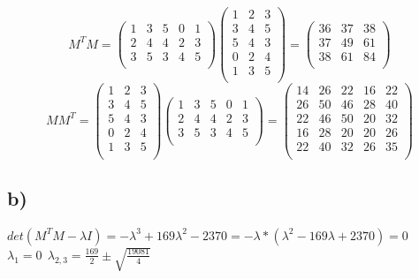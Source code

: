 \documentclass[a4paper,10pt]{article}
\begin{document}
\[M^TM = \left( \begin{array}{ccccc}
1 & 3 & 5 & 0 & 1 \\
2 & 4 & 4 & 2 & 3 \\
3 & 5 & 3 & 4 & 5 \\
\end{array} \right)
%
\left( \begin{array}{ccccc}
1 & 2 & 3 \\
3 & 4 & 5 \\
5 & 4 & 3 \\
0 & 2 & 4 \\
1 & 3 & 5 \\
\end{array} \right)
=\left( \begin{array}{ccc}
36 & 37 & 38 \\
37 & 49 & 61 \\
38 & 61 & 84 \\
\end{array} \right)
\]
\[MM^T = 
\left( \begin{array}{ccccc}
1 & 2 & 3 \\
3 & 4 & 5 \\
5 & 4 & 3 \\
0 & 2 & 4 \\
1 & 3 & 5 \\
\end{array} \right) 
\left( \begin{array}{ccccc}
1 & 3 & 5 & 0 & 1 \\
2 & 4 & 4 & 2 & 3 \\
3 & 5 & 3 & 4 & 5 \\
\end{array} \right)
=
\left( \begin{array}{ccccc}
14 & 26 & 22 & 16 & 22 \\
26 & 50 & 46 & 28 & 40 \\
22 & 46 & 50 & 20 & 32 \\
16 & 28 & 20 & 20 & 26 \\
22 & 40 & 32 & 26 & 35 \\
\end{array} \right)
\]

\subsection*{b)}
$ det(M^TM-\lambda I) = -\lambda^3 +169 \lambda^2 -2370 = -\lambda * (\lambda^2-169 \lambda +2370) =0 $ \\
$\lambda_1 =0 \ \ \lambda_{2,3}=\frac{169}{2} \pm \sqrt{\frac{19081}{4}}$ \\\\
\end{document}
